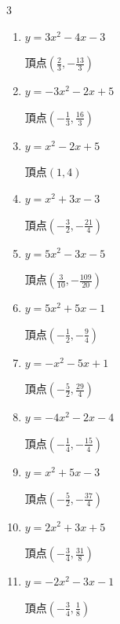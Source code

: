 \begin{multicols}{3}
\begin{enumerate}
  \item $\displaystyle y=3x^{2}-4x-3$

        $\displaystyle 頂点\left( \frac{2}{3} , -\frac{13}{3} \right)$

\columnbreak %

\resetques

  \item $\displaystyle y=-3x^{2}-2x+5$

        $\displaystyle 頂点\left( -\frac{1}{3} , \frac{16}{3} \right)$

  \item $\displaystyle y=x^{2}-2x+5$

        $\displaystyle 頂点\left( 1 , 4 \right)$

  \item $\displaystyle y=x^{2}+3x-3$

        $\displaystyle 頂点\left( -\frac{3}{2} , -\frac{21}{4} \right)$

  \item $\displaystyle y=5x^{2}-3x-5$

        $\displaystyle 頂点\left( \frac{3}{10} , -\frac{109}{20} \right)$

  \item $\displaystyle y=5x^{2}+5x-1$

        $\displaystyle 頂点\left( -\frac{1}{2} , -\frac{9}{4} \right)$

\columnbreak %

  \item $\displaystyle y=-x^{2}-5x+1$

        $\displaystyle 頂点\left( -\frac{5}{2} , \frac{29}{4} \right)$

  \item $\displaystyle y=-4x^{2}-2x-4$

        $\displaystyle 頂点\left( -\frac{1}{4} , -\frac{15}{4} \right)$

  \item $\displaystyle y=x^{2}+5x-3$

        $\displaystyle 頂点\left( -\frac{5}{2} , -\frac{37}{4} \right)$

  \item $\displaystyle y=2x^{2}+3x+5$

        $\displaystyle 頂点\left( -\frac{3}{4} , \frac{31}{8} \right)$

  \item $\displaystyle y=-2x^{2}-3x-1$

        $\displaystyle 頂点\left( -\frac{3}{4} , \frac{1}{8} \right)$


\end{enumerate}
\end{multicols}
